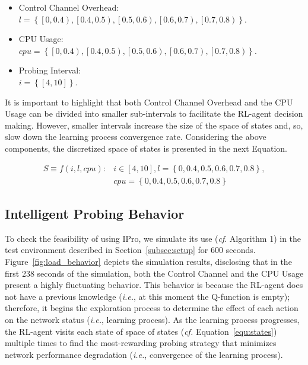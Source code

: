 \begin{itemize}
    \item Control Channel Overhead:\\ $ l =\left \{ \left [ 0,0.4 \right ), \left [ 0.4,0.5 \right ), \left [ 0.5,0.6 \right ), \left [ 0.6,0.7 \right ) ,\left [ 0.7,0.8 \right )\right \}$.
    \item CPU Usage:\\ $cpu=\left \{ \left [ 0,0.4 \right ),\left [ 0.4,0.5 \right ),\left [ 0.5,0.6 \right ),\left [ 0.6,0.7 \right ),\left [ 0.7,0.8 \right ) \right \}$.
    \item Probing Interval:\\ $i = \left \{\left [ 4,10 \right ] \right \}$.
\end{itemize}

It is important to highlight that both Control Channel Overhead and the CPU Usage can be divided into smaller sub-intervals to facilitate the RL-agent decision making. However, smaller intervals increase the size of the space of states and, so, slow down the learning process convergence rate. Considering the above components, the discretized space of states is presented in the next Equation.

\begin{equation}
    \begin{split}
      S\equiv f\left ( i, l, cpu \right ): & i\in \left [ 4,10 \right ], l=\left \{ 0,0.4,0.5,0.6,0.7,0.8 \right \},\\ 
      & cpu=\left \{ 0,0.4,0.5,0.6,0.7,0.8 \right \} 
    \end{split}
    \label{equ:states}
\end{equation}

\subsection{Intelligent Probing Behavior}
\label{subsec:ipro_behavior}
To check the feasibility of using IPro, we simulate its use (\textit{cf}. Algorithm 1) in the test environment described in Section~\ref{subsec:setup} for 600 seconds. Figure~\ref{fig:load_behavior} depicts the simulation results, disclosing that in the first 238 seconds of the simulation, both the Control Channel and the CPU Usage present a highly fluctuating behavior. This behavior is because the RL-agent does not have a previous knowledge (\textit{i.e.}, at this moment the Q-function is empty); therefore, it begins the exploration process to determine the effect of each action on the network status (\textit{i.e.}, learning process). As the learning process progresses, the RL-agent visits each state of space of states (\textit{cf.} Equation~\ref{equ:states}) multiple times to find the most-rewarding probing strategy that minimizes network performance degradation (\textit{i.e.}, convergence of the learning process).

